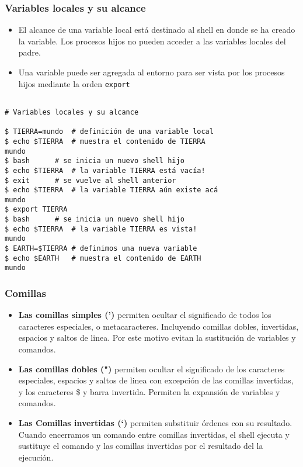 \documentclass{beamer}
\begin{document}
\begin{frame}{}
\frametitle{Variables locales y su alcance}
\begin{itemize}
\item El alcance de una variable local está destinado al shell en donde se ha creado la variable. Los procesos hijos no pueden acceder a las variables locales del padre.
\item Una variable puede ser agregada al entorno para ser vista por los procesos hijos mediante la orden \texttt{export}
\end{itemize}
\end{frame}{}

\begin{Verbatim}

# Variables locales y su alcance

$ TIERRA=mundo	# definición de una variable local
$ echo $TIERRA	# muestra el contenido de TIERRA
mundo
$ bash		# se inicia un nuevo shell hijo
$ echo $TIERRA	# la variable TIERRA está vacía!
$ exit		# se vuelve al shell anterior
$ echo $TIERRA	# la variable TIERRA aún existe acá
mundo
$ export TIERRA
$ bash		# se inicia un nuevo shell hijo
$ echo $TIERRA	# la variable TIERRA es vista!
mundo
$ EARTH=$TIERRA	# definimos una nueva variable
$ echo $EARTH	# muestra el contenido de EARTH
mundo
\end{Verbatim}

\begin{frame}{}
\frametitle{Comillas}
\begin{itemize}
\item \textbf{Las comillas simples (')} permiten ocultar el significado de todos los caracteres 
		especiales, o metacaracteres. Incluyendo comillas dobles, 
		invertidas, espacios y saltos de linea. Por este motivo evitan 
		la sustitución de variables y comandos.
\item \textbf{Las comillas dobles (")} permiten ocultar el significado de los caracteres especiales, 
 		espacios y saltos de linea con excepción de las comillas 
 		invertidas, y los caracteres \$ y barra invertida. Permiten la expansión de variables y comandos.
\item
\textbf{Las Comillas invertidas (`)} permiten substituir órdenes con su resultado.
		Cuando encerramos un comando entre comillas invertidas, el shell 
ejecuta y 
		sustituye el comando y las comillas invertidas por el resultado del 
		la ejecución.
\end{itemize}
\end{frame}{}
\end{document}
